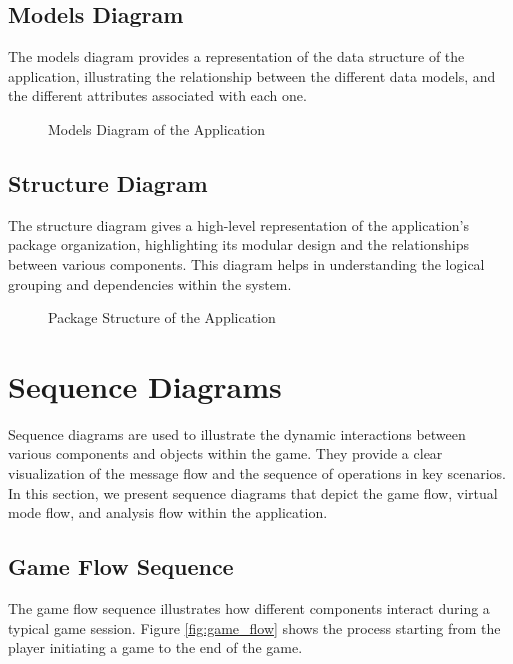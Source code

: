 \subsection{Models Diagram}
The models diagram provides a representation of the data structure of the application, illustrating the relationship between the different data models, and the different attributes associated with each one.

\begin{figure}[h]
    \centering
    
    \caption{Models Diagram of the Application}
    \label{fig:models_diagram}
\end{figure}
\vspace{-0.5cm}

\subsection{Structure Diagram}

The structure diagram gives a high-level representation of the application's package organization, highlighting its modular design and the relationships between various components. This diagram helps in understanding the logical grouping and dependencies within the system.
\begin{figure}[ht!]
    \centering
    
    \caption{Package Structure of the Application}
    \label{fig:package_structure}
\end{figure}

\section{Sequence Diagrams}

Sequence diagrams are used to illustrate the dynamic interactions between various components and objects within the game. They provide a clear visualization of the message flow and the sequence of operations in key scenarios. In this section, we present sequence diagrams that depict the game flow, virtual mode flow, and analysis flow within the application.

\subsection{Game Flow Sequence}

The game flow sequence illustrates how different components interact during a typical game session. Figure \ref{fig:game_flow} shows the process starting from the player initiating a game to the end of the game.


